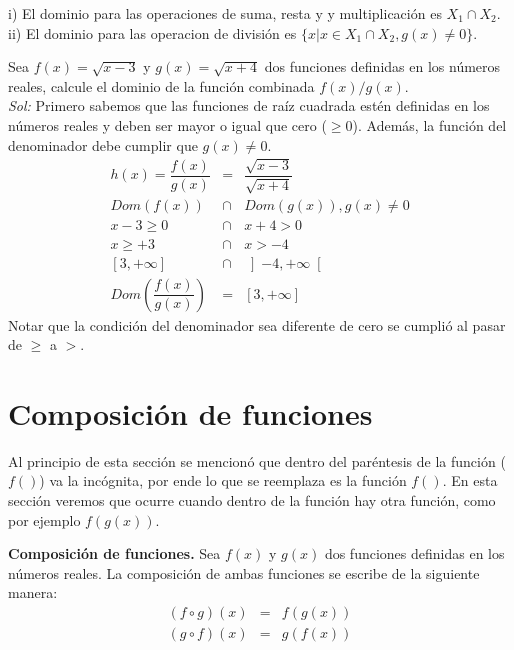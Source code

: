  \noindent i) El dominio para las operaciones de suma, resta y y multiplicación es $X_{1}\cap X_{2}$.\\
 
  \noindent ii) El dominio para las operacion de división es $\{x|x\in  X_{1}\cap X_{2}, g(x)\neq 0\}$.\\
  
\begin{myexample}
Sea $f(x)=\sqrt{x-3}$ y $g(x)=\sqrt{x+4}$ dos funciones definidas en los números reales, calcule el dominio de la función combinada $f(x)/g(x)$.\\

\textit{Sol:} Primero sabemos que las funciones de raíz cuadrada estén definidas en los números reales y deben ser mayor o igual que cero ($\geq 0$). Además, la función del denominador debe cumplir que $g(x)\neq 0$.\\
\begin{eqnarray*}
h(x)=\dfrac{f(x)}{g(x)}&=&\dfrac{\sqrt{x-3}}{\sqrt{x+4}}\\
Dom(f(x))&\cap &Dom(g(x)), g(x)\neq 0\\
x-3\geq 0 &\cap &x+4>0\\
x\geq +3 &\cap &x>-4 \\
\left[3,+\infty \right] &\cap & \left]-4,+\infty \right[\\
Dom\left(\dfrac{f(x)}{g(x)} \right) &=&\left[3,+\infty \right] 
\end{eqnarray*}
Notar que la condición del denominador sea diferente de cero se cumplió al pasar de $\geq$ a $>$.
\end{myexample}

\section{Composición de funciones}
Al principio de esta sección se mencionó que dentro del paréntesis de la función ($f()$) va la incógnita, por ende lo que se reemplaza es la función $f()$. En esta sección veremos que ocurre cuando dentro de la función hay otra función, como por ejemplo $f(g(x))$.\\

\begin{mydef}
\textbf{Composición de funciones.} Sea $f(x)$ y $g(x)$ dos funciones definidas en los números reales. La composición de ambas funciones se escribe de la siguiente manera:\\
\begin{eqnarray*}
(f\circ g)(x)&=& f(g(x)) \\
(g\circ f)(x)&=&g(f(x)) \\
\end{eqnarray*}
\end{mydef}

